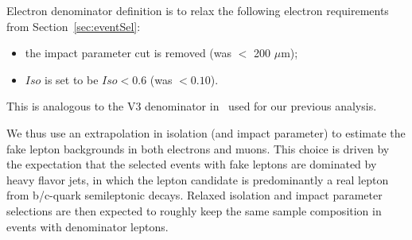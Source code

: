 Electron denominator definition is to relax the following electron requirements from
Section~\ref{sec:eventSel}:
\begin{itemize}
\item the impact parameter cut is removed (was $<$ 200 $\mu$m);
\item $Iso$ is set to be $Iso < 0.6$ (was $<0.10$).
\end{itemize}
This is analogous to the V3 denominator in~\cite{ref:fakeRateNote} used for our previous analysis.

We thus use an extrapolation  in isolation (and impact parameter) to estimate the fake lepton backgrounds 
in both electrons and muons.
This choice is driven by the expectation that the selected events with fake leptons are dominated by
heavy flavor jets, in which the lepton candidate is predominantly a real lepton from b/c-quark semileptonic decays.
Relaxed isolation and impact parameter selections are then expected to roughly keep the same sample
composition in events with denominator leptons.

